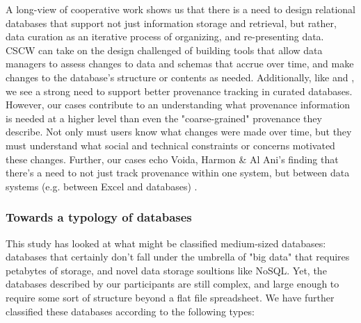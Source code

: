 A long-view of cooperative work shows us that there is a need to design relational databases that support not just information storage and retrieval, but rather, data curation as an iterative process of organizing, and re-presenting data. CSCW can take on the design challenged of building tools that allow data managers to assess changes to data and schemas that accrue over time, and make changes to the database's structure or contents as needed. Additionally, like \cite{Buneman_2006} and \cite{jagadish2007making}, we see a strong need to support better provenance tracking in curated databases. However, our cases contribute to an understanding what provenance information is needed at a higher level than even the "coarse-grained" provenance they describe. Not only must users know what changes were made over time, but they must understand what social and technical constraints or concerns motivated these changes. Further, our cases echo Voida, Harmon & Al Ani's finding that there's a need to not just track provenance within one system, but between data systems (e.g. between Excel and databases) \cite{voida2011homebrew}.

\subsubsection{Towards a typology of databases}

This study has looked at what might be classified medium-sized databases: databases that certainly don't fall under the umbrella of "big data" that requires petabytes of storage, and novel data storage soultions like NoSQL. Yet, the databases described by our participants are still complex, and large enough to require some sort of structure beyond a flat file spreadsheet. We have further classified these databases according to the following types:

